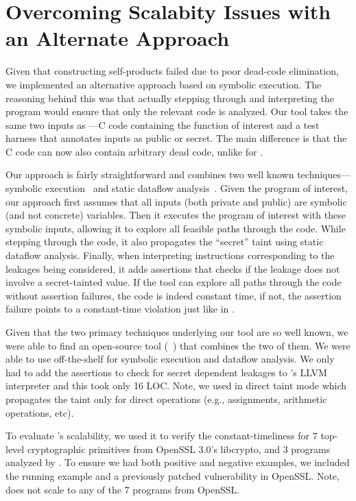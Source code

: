 \section{Overcoming Scalabity Issues with an Alternate Approach}
\label{sec:klee-taint}

Given that constructing self-products failed due to poor dead-code elimination, we implemented an alternative approach based on symbolic execution.
The reasoning behind this was that actually stepping through and interpreting the program would ensure that only the relevant code is analyzed.
Our tool takes the same two inputs as \ctVerif---C code containing the function of interest and a test harness that annotates inputs as public or secret.
The main difference is that the C code can now also contain arbitrary dead code, unlike for \ctVerif.

Our approach is fairly straightforward and combines two well known techniques---symbolic execution~\cite{symbex} and static dataflow analysis~\cite{dataflow}. Given the program of interest, our approach first assumes that all inputs (both private and public) are symbolic (and not concrete) variables. Then it executes the program of interest with these symbolic inputs, allowing it to explore all feasible paths through the code.
While stepping through the code, it also propagates the ``secret'' taint using static dataflow analysis.
Finally, when interpreting instructions corresponding to the leakages being considered, it adds assertions that checks if the leakage does not involve a secret-tainted value.
If the tool can explore all paths through the code without assertion failures, the code is indeed constant time, if not, the assertion failure points to a constant-time violation just like in \ctVerif.

Given that the two primary techniques underlying our tool are so well known, we were able to find an open-source tool (\kt~\cite{klee-taint-code}) that combines the two of them.
We were able to use \kt off-the-shelf for symbolic execution and dataflow analysis.
We only had to add the assertions to check for secret dependent leakages to \kt's LLVM interpreter and this took only 16 LOC.
Note, we used \kt in direct taint mode which propagates the taint only for direct operations (e.g., assignments, arithmetic operations, etc).

To evaluate \kt's scalability, we used it to verify the constant-timeliness for $7$ top-level cryptographic primitives from OpenSSL 3.0's libcrypto, and $3$ programs analyzed by \ctVerif.
To ensure we had both positive and negative examples, we included the running example and a previously patched vulnerability in OpenSSL.
Note, \ctVerif does not scale to any of the $7$ programs from OpenSSL.

